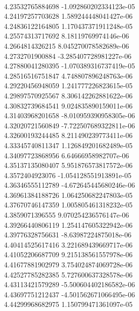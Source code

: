 { \\
4.23532765884698 -1.092860202334123e-05
 \\
4.24197257703628 1.589244448041427e-06
 \\
4.24836122164805 1.170437371911248e-05
 \\
4.25574313717692 8.18119769974146e-06
 \\
4.2664814326215 8.045270078582689e-06
 \\
4.2732701900884 -3.285407728981227e-06
 \\
4.27880041280395 -1.070389316737419e-05
 \\
4.28516516751847 4.748807896248763e-06
 \\
4.29220456948059 1.241777226823615e-05
 \\
4.29897570925567 8.306142262881622e-06
 \\
4.30832739684541 9.024835890159011e-06
 \\
4.31403968201658 -8.010959390958305e-06
 \\
4.32020721560849 -7.722507689322811e-06
 \\
4.32600193244485 8.211490239773411e-06
 \\
4.33345740811347 1.126849201682489e-05
 \\
4.34097723868956 6.64666958982707e-06
 \\
4.35137135080407 5.951876573817572e-06
 \\
4.3572404923076 -1.054128551913891e-05
 \\
4.36346555112789 -4.672645445680246e-06
 \\
4.36961384188726 1.064250682247803e-05
 \\
4.37670746147359 1.005805461318232e-05
 \\
4.3859071396555 9.070254236576147e-06
 \\
4.39266440806119 1.254147605322942e-06
 \\
4.39776328756631 -8.63987224875018e-06
 \\
4.40414525617416 3.221689439669717e-06
 \\
4.41052206687709 9.215138561557978e-06
 \\
4.41677881902979 3.754024874069728e-06
 \\
4.42527785282385 5.727600637328578e-06
 \\
4.43113421579289 -5.500604402186582e-06
 \\
4.43697751212437 -4.501562671066495e-06
 \\
4.44299968682975 1.150799471361097e-05
 \\
}
